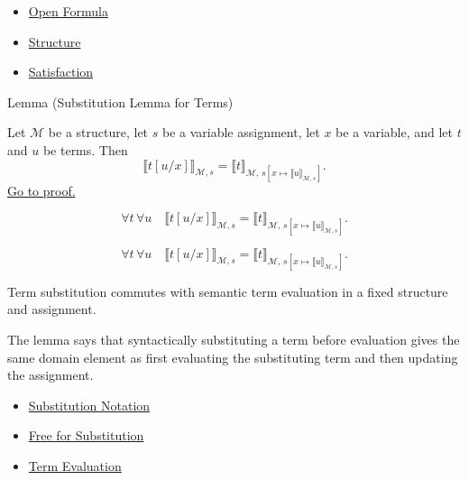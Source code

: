 \begin{dependencies}
\begin{itemize}
  \item \hyperref[def:predicate]{Open Formula}
  \item \hyperref[def:structure]{Structure}
  \item \hyperref[def:fol-satisfaction]{Satisfaction}
\end{itemize}
\end{dependencies}

\begin{lemmabox}{Lemma (Substitution Lemma for Terms)}
\begin{lemma}
\label{lem:subst-terms}
Let \(\mathcal M\) be a structure, let \(s\) be a variable assignment, let
\(x\) be a variable, and let \(t\) and \(u\) be terms. Then
\[
\llbracket t[u/x]\rrbracket_{\mathcal M,s}
=
\llbracket t\rrbracket_{\mathcal M,\,
s[x\mapsto\llbracket u\rrbracket_{\mathcal M,s}]}.
\]
\hyperref[prf:subst-terms]{Go to proof.}
\end{lemma}
\end{lemmabox}

\begin{remark*}
\[
\forall t\,\forall u\quad
\llbracket t[u/x]\rrbracket_{\mathcal M,s}
=
\llbracket t\rrbracket_{\mathcal M,\,
s[x\mapsto\llbracket u\rrbracket_{\mathcal M,s}]}.
\]
\end{remark*}

\begin{remark*}
\[
\forall t\,\forall u\quad
\llbracket t[u/x]\rrbracket_{\mathcal M,s}
=
\llbracket t\rrbracket_{\mathcal M,\,
s[x\mapsto\llbracket u\rrbracket_{\mathcal M,s}]}.
\]
\end{remark*}



\begin{remark*}[Interpretation]
Term substitution commutes with semantic term evaluation in a fixed structure
and assignment.

The lemma says that syntactically substituting a term before evaluation gives
the same domain element as first evaluating the substituting term and then
updating the assignment.
\end{remark*}

\begin{dependencies}
\begin{itemize}
  \item \hyperref[def:subst-notation]{Substitution Notation}
  \item \hyperref[def:free-for]{Free for Substitution}
  \item \hyperref[def:term-interp]{Term Evaluation}
\end{itemize}
\end{dependencies}

